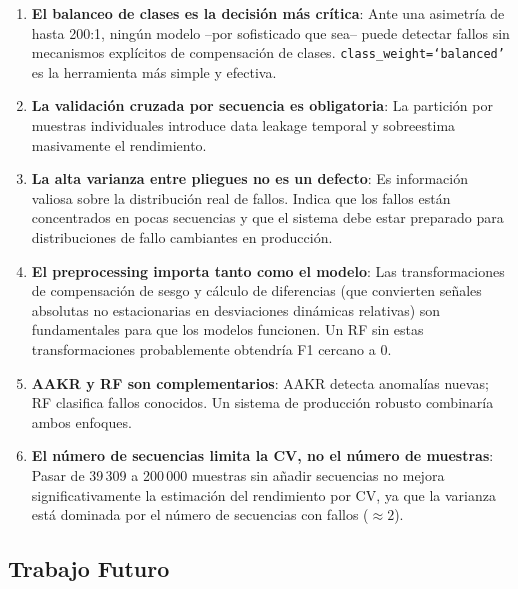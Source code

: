 \documentclass[12pt,a4paper]{article}
\begin{document}
\begin{enumerate}[itemsep=4pt]
  \item \textbf{El balanceo de clases es la decisi\'{o}n m\'{a}s cr\'{i}tica}: Ante una
    asimetr\'{i}a de hasta 200:1, ning\'{u}n modelo --por sofisticado que sea-- puede
    detectar fallos sin mecanismos expl\'{i}citos de compensaci\'{o}n de clases.
    \texttt{class\_weight=`balanced'} es la herramienta m\'{a}s simple y efectiva.

  \item \textbf{La validaci\'{o}n cruzada por secuencia es obligatoria}: La partici\'{o}n
    por muestras individuales introduce data leakage temporal y sobreestima
    masivamente el rendimiento.

  \item \textbf{La alta varianza entre pliegues no es un defecto}: Es informaci\'{o}n
    valiosa sobre la distribuci\'{o}n real de fallos. Indica que los fallos est\'{a}n
    concentrados en pocas secuencias y que el sistema debe estar preparado para
    distribuciones de fallo cambiantes en producci\'{o}n.

  \item \textbf{El preprocessing importa tanto como el modelo}: Las transformaciones
    de compensaci\'{o}n de sesgo y c\'{a}lculo de diferencias (que convierten se\~{n}ales
    absolutas no estacionarias en desviaciones din\'{a}micas relativas) son
    fundamentales para que los modelos funcionen. Un RF sin estas transformaciones
    probablemente obtendr\'{i}a F1 cercano a 0.

  \item \textbf{AAKR y RF son complementarios}: AAKR detecta anomal\'{i}as nuevas;
    RF clasifica fallos conocidos. Un sistema de producci\'{o}n robusto combinar\'{i}a
    ambos enfoques.

  \item \textbf{El n\'{u}mero de secuencias limita la CV, no el n\'{u}mero de muestras}:
    Pasar de 39\,309 a 200\,000 muestras sin a\~{n}adir secuencias no mejora
    significativamente la estimaci\'{o}n del rendimiento por CV, ya que la varianza
    est\'{a} dominada por el n\'{u}mero de secuencias con fallos ($\approx 2$).
\end{enumerate}

\subsection{Trabajo Futuro}
\end{document}
